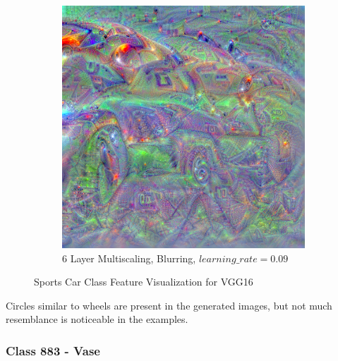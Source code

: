 \begin{figure}
\begin{subfigure}[t]{0.31\textwidth}
    \end{subfigure}
    \hfill
    \begin{subfigure}[t]{0.31\textwidth}
        \captionsetup{justification=centering}
        \centering
        \includegraphics[width=.7\linewidth]{figuras/feat_vis/experiments/classes/cl817/random_image_ci817_lr9e-2_pl6.png}
        \caption{6 Layer Multiscaling, Blurring, \(learning\_rate = 0.09\)}
    \end{subfigure}

    \caption{Sports Car Class Feature Visualization for VGG16}
    \label{fig:class_sports_car}
\end{figure}

Circles similar to wheels are present in the generated images, but not much resemblance is noticeable in the examples.

\subsubsection{Class 883 - Vase}

